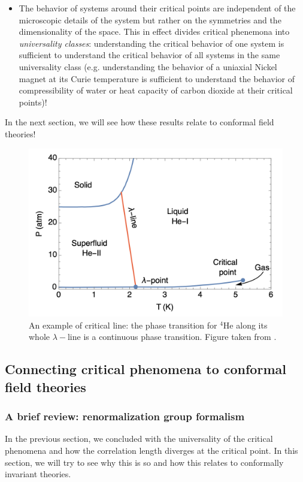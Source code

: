 \documentclass[12pt]{article}
\numberwithin{equation}{section}
\begin{document}
\begin{itemize}
	\item The behavior of systems around their critical points are independent of the microscopic details of the system but rather on the symmetries and the dimensionality of the space. This in effect divides critical phenemona into \emph{universality classes}: understanding the critical behavior of one system is sufficient to understand the critical behavior of all systems in the same universality class (e.g. understanding the behavior of a uniaxial Nickel magnet at its Curie temperature is sufficient to understand the behavior of compressibility of water or heat capacity of carbon dioxide at their critical points)!
\end{itemize}
In the next section, we will see how these results relate to conformal field theories!

\begin{figure}
	\centering 
		\includegraphics[scale=.3]{lambda_transition.png}
	\caption[Example of  a critical line: $\lambda-$line of  $^4$He]{\label{fig: lambda line}An example of critical line: the phase transition for $^4$He along its whole $\lambda-$line is a continuous phase transition. Figure taken from \cite{Chester:2019ifh}.}
\end{figure}






\subsection{Connecting critical phenomena to conformal field theories}
\subsubsection{A brief review: renormalization group formalism}
\label{sec: review of RG}
In the previous section, we concluded with the universality of the critical phenomena and how the correlation length diverges at the critical point. In this section, we will try to see why this is so and how this relates to conformally invariant theories.
\end{document}
